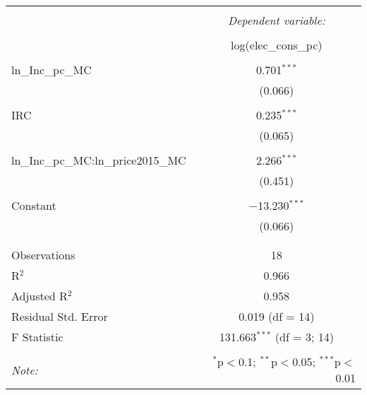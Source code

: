 
\begin{table}[!htbp] \centering 
  \caption{} 
  \label{} 
\begin{tabular}{@{\extracolsep{5pt}}lc} 
\\[-1.8ex]\hline 
\hline \\[-1.8ex] 
 & \multicolumn{1}{c}{\textit{Dependent variable:}} \\ 
\cline{2-2} 
\\[-1.8ex] & log(elec\_cons\_pc) \\ 
\hline \\[-1.8ex] 
 ln\_Inc\_pc\_MC & 0.701$^{***}$ \\ 
  & (0.066) \\ 
  & \\ 
 IRC & 0.235$^{***}$ \\ 
  & (0.065) \\ 
  & \\ 
 ln\_Inc\_pc\_MC:ln\_price2015\_MC & 2.266$^{***}$ \\ 
  & (0.451) \\ 
  & \\ 
 Constant & $-$13.230$^{***}$ \\ 
  & (0.066) \\ 
  & \\ 
\hline \\[-1.8ex] 
Observations & 18 \\ 
R$^{2}$ & 0.966 \\ 
Adjusted R$^{2}$ & 0.958 \\ 
Residual Std. Error & 0.019 (df = 14) \\ 
F Statistic & 131.663$^{***}$ (df = 3; 14) \\ 
\hline 
\hline \\[-1.8ex] 
\textit{Note:}  & \multicolumn{1}{r}{$^{*}$p$<$0.1; $^{**}$p$<$0.05; $^{***}$p$<$0.01} \\ 
\end{tabular} 
\end{table} 
